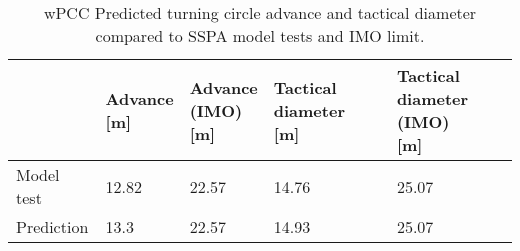 \begin{table}[ht!]
    \footnotesize
    \caption{wPCC Predicted turning circle advance and tactical diameter compared to SSPA model tests and IMO limit.}
    \label{\detokenize{06.10_results_wpcc:tab-wpcc-advance}}
    \centering
    \begin{tabular*}{\textwidth}{p{2cm} p{1.5cm} p{1.5cm} p{2.5cm} p{2.5cm}}
\toprule
&

\thead{Advance \\ {[}m{]}}
&

\thead{Advance \\ (IMO) \\ {[}m{]}}
&

\thead{Tactical diameter \\ {[}m{]}}
&

\thead{Tactical diameter \\ (IMO) \\ {[}m{]}}
\\
\hline

Model test
&

12.82
&

22.57
&

14.76
&

25.07
\\

Prediction
&

13.3
&

22.57
&

14.93
&

25.07
\\
\bottomrule
\end{tabular*}

\end{table}

